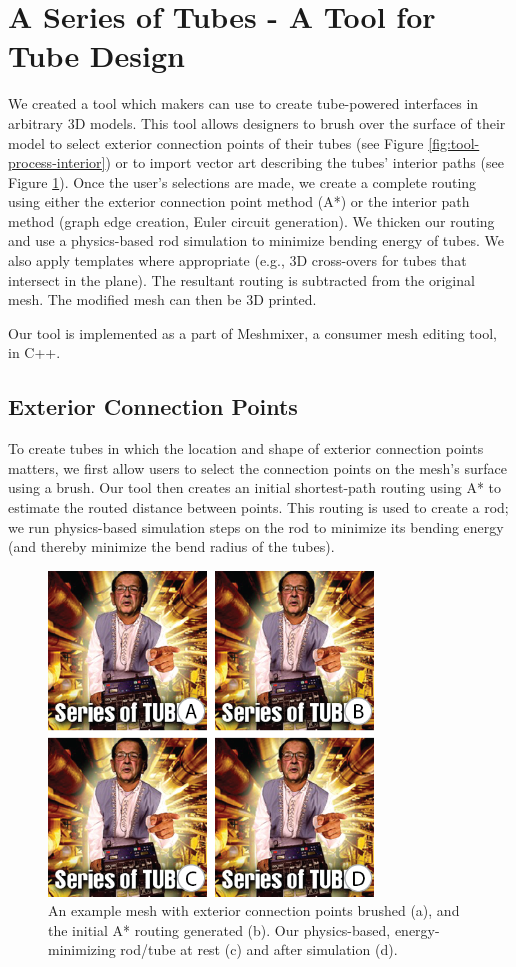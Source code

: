 \section{A Series of Tubes - A Tool for Tube Design}

We created a tool which makers can use to create tube-powered interfaces in arbitrary 3D models.  This tool allows designers to brush over the surface of their model to select exterior connection points of their tubes (see Figure \ref{fig:tool-process-interior}) or to import vector art describing the tubes' interior paths (see Figure \ref{fig:tool-process-exterior}).  Once the user's selections are made, we create a complete routing using either the exterior connection point method (A*) or the interior path method (graph edge creation, Euler circuit generation).  We thicken our routing and use a physics-based rod simulation to minimize bending energy of tubes.  We also apply templates where appropriate (e.g., 3D cross-overs for tubes that intersect in the plane).  The resultant routing is subtracted from the original mesh.  The modified mesh can then be 3D printed.

Our tool is implemented as a part of Meshmixer, a consumer mesh editing tool, in C++.

\subsection{Exterior Connection Points}

To create tubes in which the location and shape of exterior connection points matters, we first allow users to select the connection points on the mesh's surface using a brush. Our tool then creates an initial shortest-path routing using A* to estimate the routed distance between points.  This routing is used to create a rod; we run physics-based simulation steps on the rod to minimize its bending energy (and thereby minimize the bend radius of the tubes).

\begin{figure}[h!]
\centering
    \includegraphics[width=3.4in]{figures/exterior.png}
\caption{An example mesh with exterior connection points brushed (a), and the initial A* routing generated (b).  Our physics-based, energy-minimizing rod/tube at rest (c) and after simulation (d).}
\label{fig:tool-process-exterior}
\end{figure}

